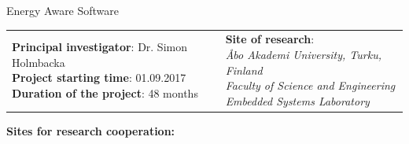 \documentclass{article}
\begin{document}
\huge{Energy Aware Software}

\begin{table}[h]
\begin{tabular}{  l  l  }
\pbox{15cm}{\normalsize\textbf{Principal investigator}: Dr. Simon Holmbacka\\\textbf{Project starting time}: 01.09.2017\\\textbf{Duration of the project}: 48 months\\} & 
\pbox{10cm}{\textbf{Site of research}:\\\textit{\AA{}bo Akademi University, Turku, Finland}\\\textit{Faculty of Science and Engineering}\\\textit{Embedded Systems Laboratory}}
 
\end{tabular}
\label{tab:strconf}
\end{table}
\normalsize
\textbf{Sites for research cooperation:}
\end{document}
